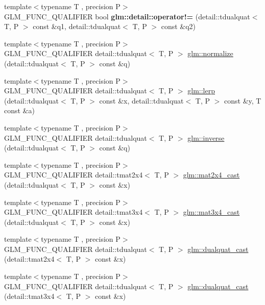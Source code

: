\begin{DoxyCompactItemize}
\item 
{\footnotesize template$<$typename T , precision P$>$ }\\G\+L\+M\+\_\+\+F\+U\+N\+C\+\_\+\+Q\+U\+A\+L\+I\+F\+I\+ER bool {\bfseries glm\+::detail\+::operator!=} (detail\+::tdualquat$<$ T, P $>$ const \&q1, detail\+::tdualquat$<$ T, P $>$ const \&q2)\hypertarget{dual__quaternion_8inl_a3a29e0a166da991141a043986318f44f}{}\label{dual__quaternion_8inl_a3a29e0a166da991141a043986318f44f}

\item 
{\footnotesize template$<$typename T , precision P$>$ }\\G\+L\+M\+\_\+\+F\+U\+N\+C\+\_\+\+Q\+U\+A\+L\+I\+F\+I\+ER detail\+::tdualquat$<$ T, P $>$ \hyperlink{group__gtc__dual__quaternion_ga4364d115fe8ee2f65ff047726133d0ad}{glm\+::normalize} (detail\+::tdualquat$<$ T, P $>$ const \&q)
\item 
{\footnotesize template$<$typename T , precision P$>$ }\\G\+L\+M\+\_\+\+F\+U\+N\+C\+\_\+\+Q\+U\+A\+L\+I\+F\+I\+ER detail\+::tdualquat$<$ T, P $>$ \hyperlink{group__gtc__dual__quaternion_ga28cbcf029272d5351d4695b8610de126}{glm\+::lerp} (detail\+::tdualquat$<$ T, P $>$ const \&x, detail\+::tdualquat$<$ T, P $>$ const \&y, T const \&a)
\item 
{\footnotesize template$<$typename T , precision P$>$ }\\G\+L\+M\+\_\+\+F\+U\+N\+C\+\_\+\+Q\+U\+A\+L\+I\+F\+I\+ER detail\+::tdualquat$<$ T, P $>$ \hyperlink{group__gtc__dual__quaternion_gaad6b9faeb1134c04defae01426a777f8}{glm\+::inverse} (detail\+::tdualquat$<$ T, P $>$ const \&q)
\item 
{\footnotesize template$<$typename T , precision P$>$ }\\G\+L\+M\+\_\+\+F\+U\+N\+C\+\_\+\+Q\+U\+A\+L\+I\+F\+I\+ER detail\+::tmat2x4$<$ T, P $>$ \hyperlink{group__gtc__dual__quaternion_gade155fb0dfc144259a25897776e73325}{glm\+::mat2x4\+\_\+cast} (detail\+::tdualquat$<$ T, P $>$ const \&x)
\item 
{\footnotesize template$<$typename T , precision P$>$ }\\G\+L\+M\+\_\+\+F\+U\+N\+C\+\_\+\+Q\+U\+A\+L\+I\+F\+I\+ER detail\+::tmat3x4$<$ T, P $>$ \hyperlink{group__gtc__dual__quaternion_ga2f4f0a1275fa95c272dd6ad6df75013d}{glm\+::mat3x4\+\_\+cast} (detail\+::tdualquat$<$ T, P $>$ const \&x)
\item 
{\footnotesize template$<$typename T , precision P$>$ }\\G\+L\+M\+\_\+\+F\+U\+N\+C\+\_\+\+Q\+U\+A\+L\+I\+F\+I\+ER detail\+::tdualquat$<$ T, P $>$ \hyperlink{group__gtc__dual__quaternion_gad47c752ec23a5f9924e7d7f84c40f3e5}{glm\+::dualquat\+\_\+cast} (detail\+::tmat2x4$<$ T, P $>$ const \&x)
\item 
{\footnotesize template$<$typename T , precision P$>$ }\\G\+L\+M\+\_\+\+F\+U\+N\+C\+\_\+\+Q\+U\+A\+L\+I\+F\+I\+ER detail\+::tdualquat$<$ T, P $>$ \hyperlink{group__gtc__dual__quaternion_ga97c4fb8941ad1954e01578cca8182180}{glm\+::dualquat\+\_\+cast} (detail\+::tmat3x4$<$ T, P $>$ const \&x)
\end{DoxyCompactItemize}


